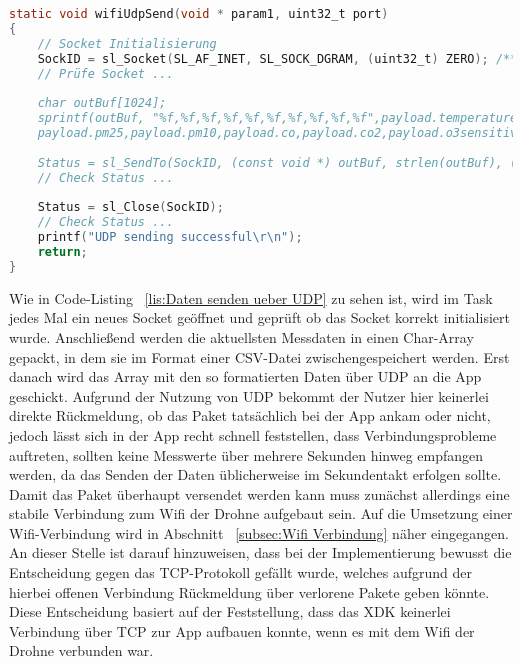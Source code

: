 \begin{lstlisting}[language=C, caption={Daten senden über \acs{UDP}}, label=lis:Daten senden ueber UDP]
static void wifiUdpSend(void * param1, uint32_t port)
{
	// Socket Initialisierung	
	SockID = sl_Socket(SL_AF_INET, SL_SOCK_DGRAM, (uint32_t) ZERO); /**<The return value is a positive number if 
	// Prüfe Socket ...
		
	char outBuf[1024];		
	sprintf(outBuf, "%f,%f,%f,%f,%f,%f,%f,%f,%f,%f",payload.temperature,payload.pressure,payload.humidity,
	payload.pm25,payload.pm10,payload.co,payload.co2,payload.o3sensitive,payload.o3lessSensitive,payload.hazardousGas);
	
	Status = sl_SendTo(SockID, (const void *) outBuf, strlen(outBuf), (uint32_t) ZERO, (SlSockAddr_t *) &Addr, AddrSize);/**<The return value is a number of characters sent;negative if not successful*/
	// Check Status ...
	
	Status = sl_Close(SockID);
	// Check Status ...
	printf("UDP sending successful\r\n");
	return;
}
\end{lstlisting}
Wie in Code-Listing ~\ref{lis:Daten senden ueber UDP} zu sehen ist, wird im Task jedes Mal ein neues Socket geöffnet und geprüft ob das Socket korrekt initialisiert wurde. Anschließend werden die aktuellsten Messdaten in einen Char-Array gepackt, in dem sie im Format einer \acf{CSV}-Datei zwischengespeichert werden. Erst danach wird das Array mit den so formatierten Daten über UDP an die App geschickt. 
\newline
\newline
Aufgrund der Nutzung von UDP bekommt der Nutzer hier keinerlei direkte Rückmeldung, ob das Paket tatsächlich bei der App ankam oder nicht, jedoch lässt sich in der App recht schnell feststellen, dass Verbindungsprobleme auftreten, sollten keine Messwerte über mehrere Sekunden hinweg empfangen werden, da das Senden der Daten üblicherweise im Sekundentakt erfolgen sollte. \newline
Damit das Paket überhaupt versendet werden kann muss zunächst allerdings eine stabile Verbindung zum Wifi der Drohne aufgebaut sein. Auf die Umsetzung einer Wifi-Verbindung wird in Abschnitt ~\ref{subsec:Wifi Verbindung} näher eingegangen.\newline
\newline
An dieser Stelle ist darauf hinzuweisen, dass bei der Implementierung bewusst die Entscheidung gegen das \acf{TCP}-Protokoll gefällt wurde, welches aufgrund der hierbei offenen Verbindung Rückmeldung über verlorene Pakete geben könnte. Diese Entscheidung basiert auf der Feststellung, dass das XDK keinerlei Verbindung über \acs{TCP} zur App aufbauen konnte, wenn es mit dem Wifi der Drohne verbunden war.
